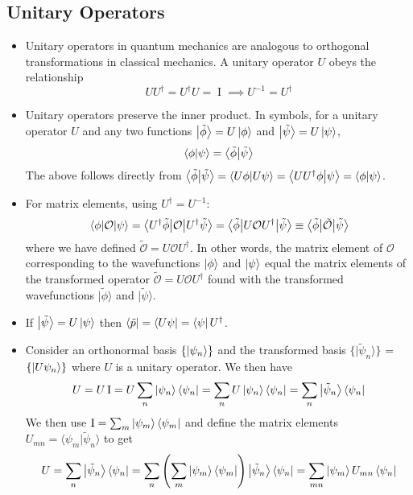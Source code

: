 \documentclass[11pt, a4paper]{article}
\renewcommand{\t}[1]{\tilde{#1}}
\renewcommand{\O}{\mathcal{O}}  %
\newcommand{\II}{\operatorname{I}}  %
\newcommand{\p}{\psi}  %
\newcommand{\bket}[1]{\big | {#1} \big \rangle }
\newcommand{\bbraket}[2]{\big \langle {#1} \big | {#2} \big \rangle}  %
\newcommand{\bmel}[3]{\big \langle {#1} \big | {#2} \big | {#3} \big \rangle}  %
\begin{document}
\subsection{Unitary Operators}
\begin{itemize}
	\item Unitary operators in quantum mechanics are analogous to orthogonal transformations in classical mechanics. A unitary operator $ U $ obeys the relationship
	\begin{equation*}
		UU^{\dagger} = U^{\dagger}U = \II \implies U^{-1} = U^{\dagger}
	\end{equation*}
	
	\item Unitary operators preserve the inner product. In symbols, for a unitary operator $ U $ and any two functions $ \bket{\t{\phi}} = U\ket{\phi} $ and $ \bket{\t{\p}} = U \ket{\p} $, 
	\begin{equation*}
		\braket{\phi}{\p} = \bbraket{\t{\phi}}{\t{\p}}
	\end{equation*}
	The above follows directly from $  \bbraket{\t{\phi}}{\t{\p}} = \braket{U\phi}{U\p} = \braket{UU^{\dagger}\phi}{\p} = \braket{\phi}{\p} $.
	
	\item For matrix elements, using $ U^{\dagger} = U^{-1} $:
	\begin{equation*}
		\mel{\phi}{\O}{\p} = \bmel{U^{\dagger}\t{\phi}}{\O}{U^{\dagger}\t{\p}} =  \bmel{\t{\phi}}{U\O U^{\dagger}}{\t{\p}} \equiv  \bmel{\t{\phi}}{\t{\O}}{\t{\p}} 
	\end{equation*}
	where we have defined $ \t{\O} = U \O U^{\dagger} $. In other words, the matrix element of $ \O $ corresponding to the wavefunctions $ \ket{\phi} $ and $ \ket{\p} $ equal the matrix elements of the transformed operator $ \t{\O} = U \O U^{\dagger}  $ found with the transformed wavefunctions $  \bket{\t{\phi}} $ and $ \bket{\t{\p}} $.
	
	\item If $ \bket{\t{\p}} = U \ket{\p}$ then $ \bra{\t{p}} = \bra{U \p} = \bra{\p}U^{\dagger} $.
	
	\item Consider an orthonormal basis $ \{\ket{\p_{n}}\} $ and the transformed basis $ \{\bket{\t{\p}_{n}}\} $ = $ \{\ket{U\p_{n}}\} $ where $ U $ is a unitary operator. We then have
	\begin{equation*}
		U = U\II = U \sum_{n}\ket{\p_{n}}\bra{\p_{n}} = \sum_{n}U\ket{\p_{n}}\bra{\p_{n}} =  \sum_{n}\bket{\t{\p}_{n}}\bra{\p_{n}}
	\end{equation*}
	We then use $ \II = \sum_{m}\ket{\p_{m}}\bra{\p_{m}} $ and define the matrix elements $ U_{mn} = \bbraket{\p_{m}}{\t{\p}_{n}} $ to get
	\begin{equation*}
		U =  \sum_{n}\bket{\t{\p}_{n}}\bra{\p_{n}} = \sum_{n}\left(\sum_{m}\ket{\p_{m}}\bra{\p_{m}}\right)\bket{\t{\p}_{n}}\bra{\p_{n}} = \sum_{mn}\ket{\p_{m}}U_{mn}\bra{\p_{n}}
	\end{equation*}
	

\end{itemize}
\end{document}
